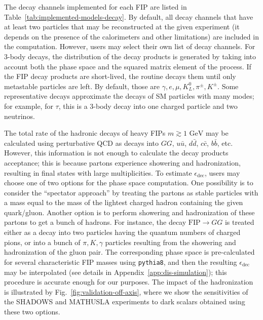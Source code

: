 \documentclass[
    aps,prd,
    twocolumn,
    nofootinbib,
    superscriptaddress,
]{revtex4}
\begin{document}
The decay channels implemented for each FIP are listed in Table~\ref{tab:implemented-models-decay}. By default, all decay channels that have at least two particles that may be reconstructed at the given experiment (it depends on the presence of the calorimeters and other limitations) are included in the computation. However, users may select their own list of decay channels. For 3-body decays, the distribution of the decay products is generated by taking into account both the phase space and the squared matrix element of the process. If the FIP decay products are short-lived, the routine decays them until only metastable particles are left. By default, those are $\gamma,e,\mu,K^{0}_{L},\pi^{\pm},K^{\pm}$. Some representative decays approximate the decays of SM particles with many modes; for example, for $\tau$, this is a 3-body decay into one charged particle and two neutrinos. 

The total rate of the hadronic decays of heavy FIPs $m\gtrsim 1\text{ GeV}$ may be calculated using perturbative QCD as decays into $GG$, $u\bar{u}$, $d\bar{d}$, $c\bar{c}$, $b\bar{b}$, etc. However, this information is not enough to calculate the decay products acceptance; this is because partons experience showering and hadronization, resulting in final states with large multiplicities. To estimate $\epsilon_{\text{dec}}$, users may choose one of two options for the phase space computation. One possibility is to consider the ``spectator approach'' by treating the partons as stable particles with a mass equal to the mass of the lightest charged hadron containing the given quark/gluon. Another option is to perform showering and hadronization of these partons to get a bunch of hadrons. For instance, the decay $\text{FIP}\to GG$ is treated either as a decay into two particles having the quantum numbers of charged pions, or into a bunch of $\pi,K,\gamma$ particles resulting from the showering and hadronization of the gluon pair. The corresponding phase space is pre-calculated for several characteristic FIP masses using \texttt{pythia8}, and then the resulting $\epsilon_{\text{dec}}$ may be interpolated (see details in Appendix~\ref{app:dis-simulation}); this procedure is accurate enough for our purposes. The impact of the hadronization is illustrated by Fig.~\ref{fig:validation-off-axis}, where we show the sensitivities of the SHADOWS and MATHUSLA experiments to dark scalars obtained using these two options.
\end{document}
